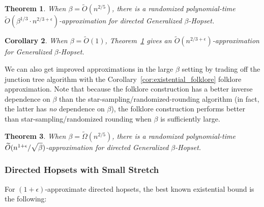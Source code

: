 \documentclass{article}
\newtheorem{theorem}{Theorem}[section]
\newtheorem{corollary}[theorem]{Corollary}
\theoremstyle{definition}
\theoremstyle{remark}
\def\be    {\beta}
\def\hopset {{\sc Generalized $\beta$-Hopset}}
\begin{document}
\begin{theorem} \label{thm:small_be_dir_gen}
    When $\be = \widetilde{O}(n^{2/5})$, there is a randomized polynomial-time $\widetilde{O}(\be^{1/3} \cdot n^{2/3 + \epsilon})$-approximation for directed {\hopset}.
\end{theorem}
\begin{corollary}
    When $\be = \widetilde{O}(1)$, Theorem~\ref{thm:small_be_dir_gen} gives an $\widetilde{O}(n^{2/3 + \epsilon})$-approximation for {\hopset}.
\end{corollary}

We can also get improved approximations in the large $\beta$ setting by trading off the junction tree algorithm with the Corollary~\ref{cor:existential_folklore} folklore approximation. Note that because the folklore construction has a better inverse dependence on $\beta$ than the star-sampling/randomized-rounding algorithm (in fact, the latter has \textit{no} dependence on $\be$), the folklore construction performs better than star-sampling/randomized rounding when $\be$ is sufficiently large.

\begin{theorem} \label{thm:big_be_dir_gen}
    When $\be = \widetilde{\Omega}(n^{2/5})$, there is a randomized polynomial-time $\widetilde{O}( n^{1+\epsilon} / \sqrt{\vphantom{\be^k} \be})$-approximation for directed {\hopset}.
\end{theorem}

\subsubsection{Directed Hopsets with Small Stretch}

For $(1+\epsilon)$-approximate directed hopsets, the best known existential bound is the following:
\end{document}
